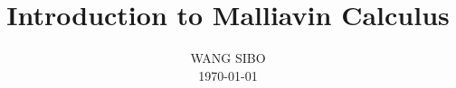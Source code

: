 

\setcounter{chapter}{-1}


\begin{sloppypar}

\frontmatter

\makeatletter

\makeatother

\title{Introduction to Malliavin Calculus}
\author{WANG SIBO\\ \today}

\maketitle

\tableofcontents

\mainmatter







%



\end{sloppypar}
